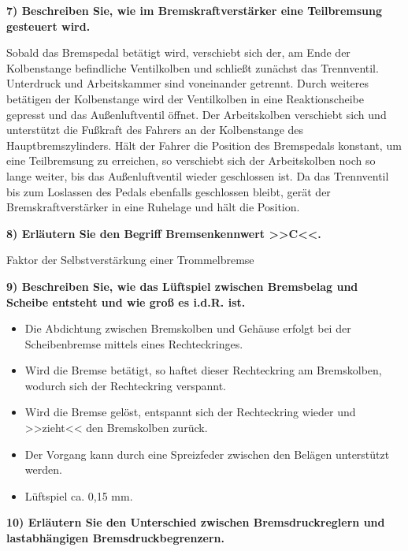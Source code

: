 \textbf{7) Beschreiben Sie, wie im Bremskraftverstärker eine
Teilbremsung gesteuert wird.}

Sobald das Bremspedal betätigt wird, verschiebt sich der, am Ende der
Kolbenstange befindliche Ventilkolben und schließt zunächst das
Trennventil. Unterdruck und Arbeitskammer sind voneinander getrennt.
Durch weiteres betätigen der Kolbenstange wird der Ventilkolben in eine
Reaktionscheibe gepresst und das Außenluftventil öffnet. Der
Arbeitskolben verschiebt sich und unterstützt die Fußkraft des Fahrers
an der Kolbenstange des Hauptbremszylinders. Hält der Fahrer die
Position des Bremspedals konstant, um eine Teilbremsung zu erreichen, so
verschiebt sich der Arbeitskolben noch so lange weiter, bis das
Außenluftventil wieder geschlossen ist. Da das Trennventil bis zum
Loslassen des Pedals ebenfalls geschlossen bleibt, gerät der
Bremskraftverstärker in eine Ruhelage und hält die Position.

\textbf{8) Erläutern Sie den Begriff Bremsenkennwert >>C<<.}

Faktor der Selbstverstärkung einer Trommelbremse

\textbf{9) Beschreiben Sie, wie das Lüftspiel zwischen Bremsbelag und
Scheibe entsteht und wie groß es i.d.R. ist.}

\begin{itemize}
\item
  Die Abdichtung zwischen Bremskolben und Gehäuse erfolgt bei der
  Scheibenbremse mittels eines Rechteckringes.
\item
  Wird die Bremse betätigt, so haftet dieser Rechteckring am
  Bremskolben, wodurch sich der Rechteckring verspannt.
\item
  Wird die Bremse gelöst, entspannt sich der Rechteckring wieder und
  >>zieht<< den Bremskolben zurück.
\item
  Der Vorgang kann durch eine Spreizfeder zwischen den Belägen
  unterstützt werden.
\item
  Lüftspiel ca. 0,15 mm.
\end{itemize}

\textbf{10) Erläutern Sie den Unterschied zwischen Bremsdruckreglern und
lastabhängigen Bremsdruckbegrenzern.}


